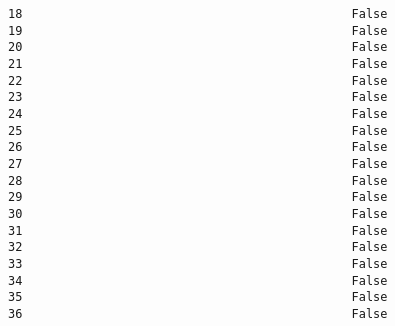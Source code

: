 \documentclass[11pt]{article}
\begin{document}
\begin{Verbatim}[commandchars=\\\{\}]
18                                              False                                                                                      
19                                              False                                                                                      
20                                              False                                                                                      
21                                              False                                                                                      
22                                              False                                                                                      
23                                              False                                                                                      
24                                              False                                                                                      
25                                              False                                                                                      
26                                              False                                                                                      
27                                              False                                                                                      
28                                              False                                                                                      
29                                              False                                                                                      
30                                              False                                                                                      
31                                              False                                                                                      
32                                              False                                                                                      
33                                              False                                                                                      
34                                              False                                                                                      
35                                              False                                                                                      
36                                              False                                                                                      

\end{Verbatim}
\end{document}

